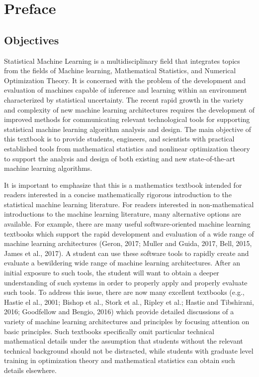 \chapter*{Preface}
\label{preface}

\section*{Objectives}
Statistical Machine Learning is a multidisciplinary field that integrates topics from the fields of 
Machine learning, Mathematical Statistics, and
Numerical Optimization Theory. 
It is concerned with the problem of the development and evaluation of machines capable of inference
and learning within an environment characterized by statistical uncertainty.
The recent rapid growth in the variety and complexity of new 
machine learning architectures requires the development of improved methods for communicating
relevant technological tools for supporting statistical machine learning algorithm analysis and design. 
The main objective of this textbook is to provide
students, engineers, and scientists with practical established tools from mathematical
statistics and nonlinear optimization theory to support the
analysis and design of both existing and new state-of-the-art machine learning algorithms.

It is important to emphasize that this is a mathematics
textbook intended for readers interested in a concise mathematically rigorous introduction to the
statistical machine learning literature. For readers interested in non-mathematical introductions to the machine learning
literature, many alternative options are available.
For example, there are many useful software-oriented machine learning textbooks 
which support the rapid development and evaluation of a wide range of machine learning architectures
(Geron, 2017; Muller and Guida, 2017, Bell, 2015, James et al., 2017). A student can use these software tools to rapidly create and evaluate a bewildering wide range
of machine learning architectures. After an initial exposure to such tools, the student will want
to obtain a deeper understanding of such systems in order to properly apply and properly evaluate such tools.
To address this issue, there are now many excellent textbooks 
(e.g., Hastie el al., 2001; Bishop et al., Stork et al., Ripley et al.; Hastie and Tibshirani, 2016; Goodfellow and Bengio, 2016)
which provide detailed discussions of a variety
of machine learning architectures and principles by focusing attention on basic principles.
Such textbooks 
specifically omit particular technical mathematical details under the assumption that students without
the relevant technical background should not be distracted, while students with
graduate level training in optimization theory and mathematical statistics can obtain such details elsewhere.

